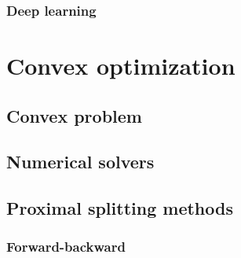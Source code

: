 \documentclass[a4paper,12pt,twoside]{report}
\begin{document}
\subsection{Deep learning}


\chapter{Convex optimization}

\section{Convex problem}

\section{Numerical solvers}

\section{Proximal splitting methods}

\subsection{Forward-backward}
\end{document}
